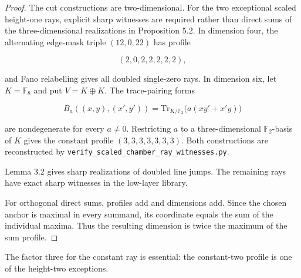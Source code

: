 \documentclass[11pt]{article}
\theoremstyle{remark}
\numberwithin{equation}{section}
\begin{document}
\begin{proof}

The cut constructions are two-dimensional. For the two exceptional scaled
height-one rays, explicit sharp witnesses are required rather than direct sums
of the three-dimensional realizations in Proposition 5.2. In dimension four,
the alternating edge-mask triple $(12,0,22)$ has profile

\nopagebreak[4]
\[
(2,0,2,2,2,2,2),
\]

and Fano relabelling gives all doubled single-zero rays. In dimension six, let
$K=\mathbb F_8$ and put $V=K\oplus K$. The trace-pairing forms

\nopagebreak[4]
\[
B_a((x,y),(x',y'))=\mathrm{Tr}_{K/\mathbb F_2}
\bigl(a(xy'+x'y)\bigr)
\]

are nondegenerate for every $a\ne0$. Restricting $a$ to a three-dimensional
$\mathbb F_2$-basis of $K$ gives the constant profile $(3,3,3,3,3,3,3)$.
Both constructions are reconstructed by
\nolinkurl{verify_scaled_chamber_ray_witnesses.py}.

Lemma 3.2 gives sharp realizations of doubled line jumps. The remaining rays
have exact sharp witnesses in the low-layer library.

For orthogonal direct sums, profiles add and dimensions add. Since the chosen
anchor is maximal in every summand, its coordinate equals the sum of the
individual maxima. Thus the resulting dimension is twice the maximum of the
sum profile.
\end{proof}


The factor three for the constant ray is essential: the constant-two profile is
one of the height-two exceptions.
\end{document}
